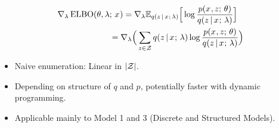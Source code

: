 \begin{frame}
\begin{align*}
 \nabla_{\lambda} \operatorname*{ELBO}(\theta, \lambda &; \, x^{}) = \nabla_{\lambda} \mathbb{E}_{ q(z \,|\, x^{} ; \, \lambda)} \Big[ \log \frac{p(x^{}, z ; \, \theta)}{q(z \,|\, x^{} ; \, \lambda)} \Big]\\
 & =  \nabla_{\lambda} \Big( \sum_{z \in \mathcal{Z}}q(z \,|\, x^{} ; \, \lambda) \log \frac{p(x^{}, z ; \, \theta)}{q(z \,|\, x^{} ; \, \lambda)} \Big)
 \end{align*}

\begin{itemize}
    \item Naive enumeration: Linear in $|\mathcal{Z}|$.
    \item Depending on structure of $q$ and $p$, potentially faster with dynamic programming.
    \item Applicable mainly to Model 1 and 3 (Discrete and Structured Models).
\end{itemize}
\end{frame}



